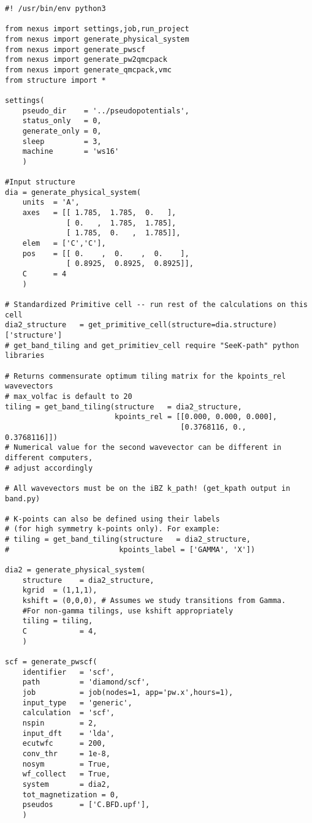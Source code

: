\documentclass[oneside,11pt]{memoir}
\numberwithin{equation}{section}
\begin{document}
\begin{verbatim}
#! /usr/bin/env python3

from nexus import settings,job,run_project
from nexus import generate_physical_system
from nexus import generate_pwscf
from nexus import generate_pw2qmcpack
from nexus import generate_qmcpack,vmc
from structure import *

settings(
    pseudo_dir    = '../pseudopotentials',
    status_only   = 0,
    generate_only = 0,
    sleep         = 3,
    machine       = 'ws16'
    )

#Input structure
dia = generate_physical_system(
    units  = 'A',
    axes   = [[ 1.785,  1.785,  0.   ],
              [ 0.   ,  1.785,  1.785],
              [ 1.785,  0.   ,  1.785]],
    elem   = ['C','C'],
    pos    = [[ 0.    ,  0.    ,  0.    ],
              [ 0.8925,  0.8925,  0.8925]],
    C      = 4
    )

# Standardized Primitive cell -- run rest of the calculations on this cell
dia2_structure   = get_primitive_cell(structure=dia.structure)['structure']
# get_band_tiling and get_primitiev_cell require "SeeK-path" python libraries

# Returns commensurate optimum tiling matrix for the kpoints_rel wavevectors
# max_volfac is default to 20
tiling = get_band_tiling(structure   = dia2_structure,
                         kpoints_rel = [[0.000, 0.000, 0.000],
                                        [0.3768116, 0.,        0.3768116]])
# Numerical value for the second wavevector can be different in different computers, 
# adjust accordingly

# All wavevectors must be on the iBZ k_path! (get_kpath output in band.py)

# K-points can also be defined using their labels 
# (for high symmetry k-points only). For example:
# tiling = get_band_tiling(structure   = dia2_structure,
#                         kpoints_label = ['GAMMA', 'X'])

dia2 = generate_physical_system(
    structure    = dia2_structure,
    kgrid  = (1,1,1),
    kshift = (0,0,0), # Assumes we study transitions from Gamma. 
    #For non-gamma tilings, use kshift appropriately
    tiling = tiling,
    C            = 4,
    )

scf = generate_pwscf(
    identifier   = 'scf',
    path         = 'diamond/scf',
    job          = job(nodes=1, app='pw.x',hours=1),
    input_type   = 'generic',
    calculation  = 'scf',
    nspin        = 2,
    input_dft    = 'lda',
    ecutwfc      = 200,
    conv_thr     = 1e-8,
    nosym        = True,
    wf_collect   = True,
    system       = dia2,
    tot_magnetization = 0,
    pseudos      = ['C.BFD.upf'],
    )


\end{verbatim}
\end{document}
